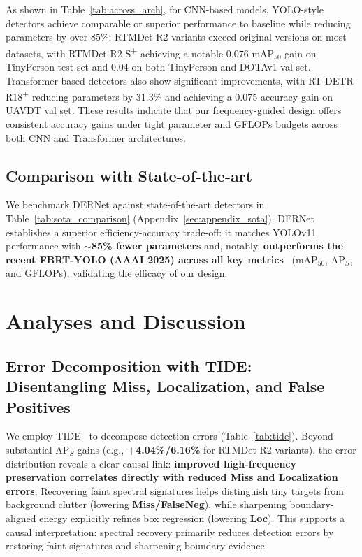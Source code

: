 \documentclass{article}
\theoremstyle{plain}
\theoremstyle{definition}
\theoremstyle{remark}
\begin{document}
    
\noindent As shown in Table~\ref{tab:across_arch}, for CNN-based models, YOLO-style detectors achieve comparable or superior performance to baseline while reducing parameters by over 85\%; RTMDet-R2 variants exceed original versions on most datasets, with RTMDet-R2-S\textsuperscript{\tiny +} achieving a notable 0.076 mAP$_{50}$ gain on TinyPerson test set and 0.04 on both TinyPerson and DOTAv1 val set. Transformer-based detectors also show significant improvements, with RT-DETR-R18\textsuperscript{\tiny +} reducing parameters by 31.3\% and achieving a 0.075 accuracy gain on UAVDT val set. These results indicate that our frequency-guided design offers consistent accuracy gains under tight parameter and GFLOPs budgets across both CNN and Transformer architectures.


\subsection{Comparison with State-of-the-art}
We benchmark DERNet against state-of-the-art detectors in Table~\ref{tab:sota_comparison} (Appendix~\ref{sec:appendix_sota}). DERNet establishes a superior efficiency-accuracy trade-off: it matches YOLOv11 performance with $\sim$\textbf{85\% fewer parameters} and, notably, \textbf{outperforms the recent FBRT-YOLO (AAAI 2025) across all key metrics}~\cite{fbrt-yolo} (mAP$_{50}$, AP$_S$, and GFLOPs), validating the efficacy of our design.


\section{Analyses and Discussion}
\subsection{Error Decomposition with TIDE: Disentangling Miss, Localization, and False Positives}

We employ TIDE~\cite{tide} to decompose detection errors (Table~\ref{tab:tide}). Beyond substantial AP$_S$ gains (e.g., \textbf{+4.04\%/6.16\%} for RTMDet-R2 variants), the error distribution reveals a clear causal link: \textbf{improved high-frequency preservation correlates directly with reduced Miss and Localization errors}. Recovering faint spectral signatures helps distinguish tiny targets from background clutter (lowering \textbf{Miss/FalseNeg}), while sharpening boundary-aligned energy explicitly refines box regression (lowering \textbf{Loc}). This supports a causal interpretation: spectral recovery primarily reduces detection errors by restoring faint signatures and sharpening boundary evidence.
\end{document}
